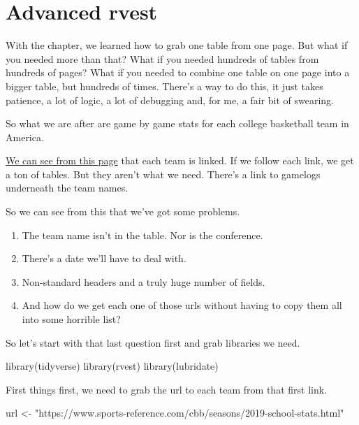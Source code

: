 \documentclass[
]{book}
\newenvironment{Shaded}{\begin{snugshade}}{\end{snugshade}}
\newcommand{\FunctionTok}[1]{\textcolor[rgb]{0.00,0.00,0.00}{#1}}
\newcommand{\NormalTok}[1]{#1}
\newcommand{\OtherTok}[1]{\textcolor[rgb]{0.56,0.35,0.01}{#1}}
\newcommand{\StringTok}[1]{\textcolor[rgb]{0.31,0.60,0.02}{#1}}
\providecommand{\tightlist}{%
  \setlength{\itemsep}{0pt}\setlength{\parskip}{0pt}}
\begin{document}
\hypertarget{advanced-rvest}{%
\chapter{Advanced rvest}\label{advanced-rvest}}

With the chapter, we learned how to grab one table from one page. But what if you needed more than that? What if you needed hundreds of tables from hundreds of pages? What if you needed to combine one table on one page into a bigger table, but hundreds of times. There's a way to do this, it just takes patience, a lot of logic, a lot of debugging and, for me, a fair bit of swearing.

So what we are after are game by game stats for each college basketball team in America.

\href{https://www.sports-reference.com/cbb/seasons/2019-school-stats.html}{We can see from this page} that each team is linked. If we follow each link, we get a ton of tables. But they aren't what we need. There's a link to gamelogs underneath the team names.

So we can see from this that we've got some problems.

\begin{enumerate}
\def\labelenumi{\arabic{enumi}.}
\tightlist
\item
  The team name isn't in the table. Nor is the conference.
\item
  There's a date we'll have to deal with.
\item
  Non-standard headers and a truly huge number of fields.
\item
  And how do we get each one of those urls without having to copy them all into some horrible list?
\end{enumerate}

So let's start with that last question first and grab libraries we need.

\begin{Shaded}
\begin{Highlighting}[]
\FunctionTok{library}\NormalTok{(tidyverse)}
\FunctionTok{library}\NormalTok{(rvest)}
\FunctionTok{library}\NormalTok{(lubridate)}
\end{Highlighting}
\end{Shaded}

First things first, we need to grab the url to each team from that first link.

\begin{Shaded}
\begin{Highlighting}[]
\NormalTok{url }\OtherTok{\textless{}{-}} \StringTok{"https://www.sports{-}reference.com/cbb/seasons/2019{-}school{-}stats.html"}
\end{Highlighting}
\end{Shaded}
\end{document}
